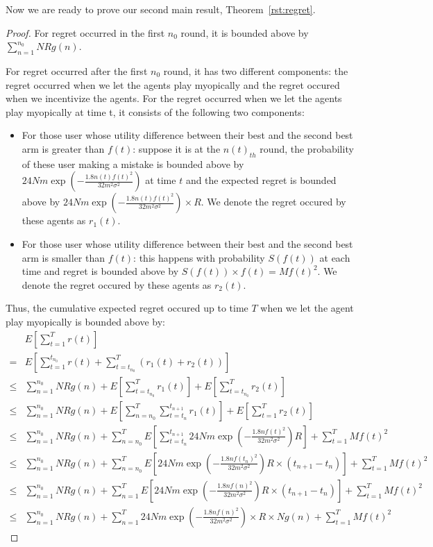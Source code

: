 \documentclass{article}
\begin{document}
Now we are ready to prove our second main result, Theorem~\ref{rst:regret}.

\begin{proof}
For regret occurred in the first $n_0$ round, it is bounded above by $\sum_{n=1}^{n_{0}}NRg(n)$.

For regret occurred after the first $n_0$ round, it has two different components: the regret occurred when we let the agents play myopically and the regret occured when we incentivize the agents. For the regret occurred when we let the agents play myopically at time t, it consists of the following two components:
\begin{itemize}
\item For those user whose utility difference between their best and the second best arm is greater than $f(t)$: suppose it is at the $n(t)_{th}$ round, the probability of these user making a mistake is bounded above by $24Nm\exp\left(-\frac{1.8n(t) f(t)^2}{32 m^2\sigma^2}\right)$ at time $t$ and the expected regret is bounded above by $24Nm\exp\left(-\frac{1.8n(t) f(t)^2}{32 m^2\sigma^2}\right)\times R$. We denote the regret occured by these agents as $r_1(t)$.
\item For those user whose utility difference between their best and the second best arm is smaller than $f(t)$: this happens with probability $S(f(t))$ at each time and regret is bounded above by $S(f(t)) \times f(t)=Mf(t)^2$. We denote the regret occured by these agents as $r_2(t)$.
\end{itemize}

Thus, the cumulative expected regret occured up to time $T$ when we let the agent play myopically is bounded above by:
\begin{align}
&E\left[\sum_{t=1}^{T}r(t)\right] \nonumber \\
=&E\left[\sum_{t=1}^{t_{n_{0}}} r(t) + \sum_{t=t_{n_{0}}}^{T}(r_1(t)+r_2(t))\right]  \nonumber \\
\leq & \sum_{n=1}^{n_{0}}NRg(n) + E\left[\sum_{t=t_{n_{0}}}^{T}r_1(t)\right]+ E\left[\sum_{t=t_{n_{0}}}^{T}r_2(t)\right] \nonumber \\
\leq & \sum_{n=1}^{n_{0}}NRg(n) + E\left[\sum_{n=n_{0}}^{T}\sum_{t=t_{n}}^{t_{n+1}}r_1(t)\right]+ E\left[\sum_{t=1}^{T}r_2(t)\right] \nonumber \\
\leq & \sum_{n=1}^{n_{0}}NRg(n) + \sum_{n=n_{0}}^{T}E\left[\sum_{t=t_{n}}^{t_{n+1}}24Nm\exp\left(-\frac{1.8n f(t)^2}{32 m^2\sigma^2}\right) R\right]+ \sum_{t=1}^{T}Mf(t)^2 \nonumber \\
\leq & \sum_{n=1}^{n_{0}}NRg(n) + \sum_{n=n_{0}}^{T}E\left[24Nm\exp\left(-\frac{1.8n f(t_n)^2}{32 m^2\sigma^2}\right)R \times (t_{n+1}-t_{n})\right]+ \sum_{t=1}^{T}Mf(t)^2 \nonumber \\
\leq & \sum_{n=1}^{n_{0}}NRg(n) + \sum_{n=1}^{T}E\left[24Nm\exp\left(-\frac{1.8n f(n)^2}{32 m^2\sigma^2}\right)R\times (t_{n+1}-t_{n})\right]+ \sum_{t=1}^{T}Mf(t)^2 \nonumber \\
\leq & \sum_{n=1}^{n_{0}}NRg(n) + \sum_{n=1}^{T} 24Nm\exp\left(-\frac{1.8n f(n)^2}{32 m^2\sigma^2}\right)\times R \times Ng(n)+ \sum_{t=1}^{T}Mf(t)^2 \nonumber
\end{align}


\end{proof}
\end{document}
